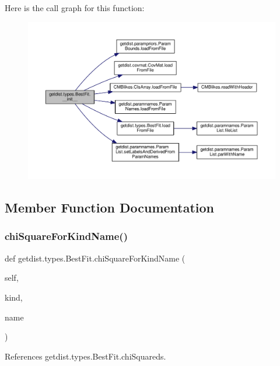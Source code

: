 Here is the call graph for this function\+:
\nopagebreak
\begin{figure}[H]
\begin{center}
\leavevmode
\includegraphics[width=350pt]{classgetdist_1_1types_1_1BestFit_aa7ed592ec07bd8fe4d9a6de635a6364c_cgraph}
\end{center}
\end{figure}


\subsection{Member Function Documentation}
\mbox{\label{classgetdist_1_1types_1_1BestFit_a54c4939e00eb6427284774a238fc61de}} 
\subsubsection{\texorpdfstring{chi\+Square\+For\+Kind\+Name()}{chiSquareForKindName()}}
{\footnotesize\ttfamily def getdist.\+types.\+Best\+Fit.\+chi\+Square\+For\+Kind\+Name (\begin{DoxyParamCaption}\item[{}]{self,  }\item[{}]{kind,  }\item[{}]{name }\end{DoxyParamCaption})}



References getdist.\+types.\+Best\+Fit.\+chi\+Squareds.

